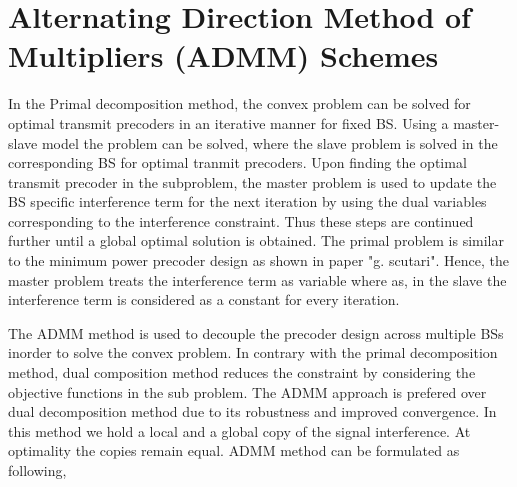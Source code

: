 \section{Alternating Direction Method of Multipliers (\acs{ADMM}) Schemes}

In the Primal decomposition method, the convex problem can be solved for optimal transmit precoders in an iterative manner for fixed \ac{BS}. Using a master-slave model the problem can be solved, where the slave problem is solved in the corresponding \ac{BS} for optimal tranmit precoders. Upon finding the optimal transmit precoder in the subproblem, the master problem is used to update the \ac{BS} specific interference term for the next iteration by using the dual variables corresponding to the interference constraint. Thus these steps are continued further until a global optimal solution is obtained. The primal problem is similar to the minimum power precoder design as shown in paper "g. scutari". Hence, the master problem treats the interference term as variable where as, in the slave the interference term is considered as a constant for every iteration. 

The \ac{ADMM} method is used to decouple the precoder design across multiple \ac{BS}s inorder to solve the convex problem. In contrary with the primal decomposition method,  dual composition method reduces the constraint by considering the objective functions in the sub problem. The \ac{ADMM} approach is prefered over dual decomposition method due to its robustness and improved convergence. In this method we hold a local and a global copy of the signal interference. At optimality the copies remain equal.
\acs{ADMM} method can be formulated as following,

